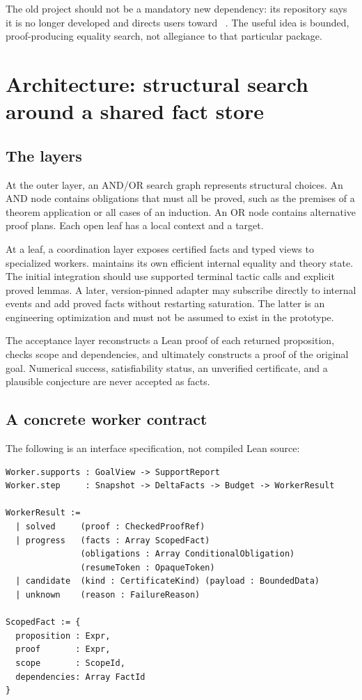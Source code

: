 The old  project should not be a mandatory new dependency: its repository says it is no longer developed and directs users toward \grind{}~\cite{egg}. The useful idea is bounded, proof-producing equality search, not allegiance to that particular package.

\section{Architecture: structural search around a shared fact store}

\subsection{The layers}

At the outer layer, an AND/OR search graph represents structural choices. An AND node contains obligations that must all be proved, such as the premises of a theorem application or all cases of an induction. An OR node contains alternative proof plans. Each open leaf has a local context and a target.

At a leaf, a coordination layer exposes certified facts and typed views to specialized workers. \grind{} maintains its own efficient internal equality and theory state. The initial integration should use supported terminal tactic calls and explicit proved lemmas. A later, version-pinned adapter may subscribe directly to internal events and add proved facts without restarting saturation. The latter is an engineering optimization and must not be assumed to exist in the prototype.

The acceptance layer reconstructs a Lean proof of each returned proposition, checks scope and dependencies, and ultimately constructs a proof of the original goal. Numerical success, satisfiability status, an unverified certificate, and a plausible conjecture are never accepted as facts.

\subsection{A concrete worker contract}

The following is an interface specification, not compiled Lean source:

\begin{lstlisting}
Worker.supports : GoalView -> SupportReport
Worker.step     : Snapshot -> DeltaFacts -> Budget -> WorkerResult

WorkerResult :=
  | solved     (proof : CheckedProofRef)
  | progress   (facts : Array ScopedFact)
               (obligations : Array ConditionalObligation)
               (resumeToken : OpaqueToken)
  | candidate  (kind : CertificateKind) (payload : BoundedData)
  | unknown    (reason : FailureReason)

ScopedFact := {
  proposition : Expr,
  proof       : Expr,
  scope       : ScopeId,
  dependencies: Array FactId
}
\end{lstlisting}

